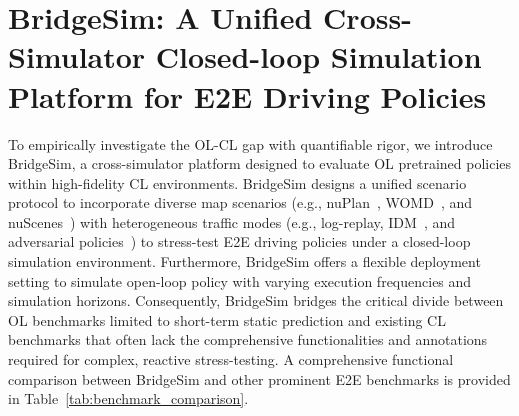 \documentclass{article}
\begin{document}
\begin{table}[tbh]
\centering
\caption{Comparisons with other E2E open-loop and closed-loop benchmarks. MV-Consistency: multi-view temporal consistency, TF-Consistency: Traffic elements annotations consistency. PG: procedural map and behavior generation. See Appendix~\ref{appendix:bridgesim_platform} for more details of BridgeSim platform.}
\label{tab:benchmark_comparison}
\end{table}

\section{BridgeSim: A Unified Cross-Simulator Closed-loop Simulation Platform for E2E Driving Policies}
\label{section:bridgesim_platform}

To empirically investigate the OL-CL gap with quantifiable rigor, we introduce BridgeSim, a cross-simulator platform designed to evaluate OL pretrained policies within high-fidelity CL environments. BridgeSim designs a unified scenario protocol to incorporate diverse map scenarios (e.g., nuPlan~\cite{caesar2021nuplan}, WOMD~\cite{mei2022waymo}, and nuScenes~\cite{caesar2020nuscenes}) with heterogeneous traffic modes (e.g., log-replay, IDM~\cite{idm}, and adversarial policies~\cite{advbmt}) to stress-test E2E driving policies under a closed-loop simulation environment. Furthermore, BridgeSim offers a flexible deployment setting to simulate open-loop policy with varying execution frequencies and simulation horizons. Consequently, BridgeSim bridges the critical divide between OL benchmarks limited to short-term static prediction and existing CL benchmarks that often lack the comprehensive functionalities and annotations required for complex, reactive stress-testing. A comprehensive functional comparison between BridgeSim and other prominent E2E benchmarks is provided in Table~\ref{tab:benchmark_comparison}. 
\end{document}
